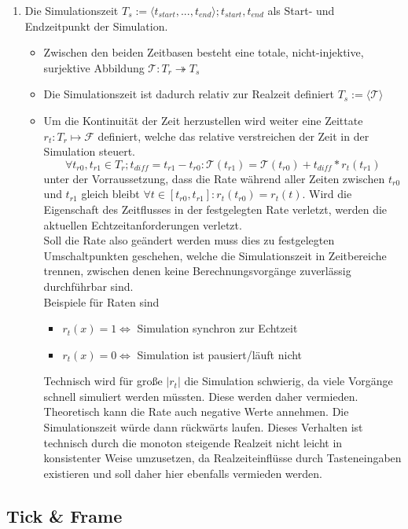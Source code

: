 \begin{enumerate}
\item Die Simulationszeit $T_s:=\langle t_{start}, ... , t_{end}\rangle; t_{start}, t_{end}$ als Start- und Endzeitpunkt der Simulation.
	\begin{itemize}
	\item Zwischen den beiden Zeitbasen besteht eine totale, nicht-injektive, surjektive Abbildung $\mathcal{T}:T_r \twoheadrightarrow T_s$
	\item Die Simulationszeit ist dadurch relativ zur Realzeit definiert $T_s:=\langle\mathcal{T}\rangle$
	\item Um die Kontinuität der Zeit herzustellen wird weiter eine Zeittate $r_t:T_r\mapsto\mathcal{F}$ definiert, welche das relative verstreichen der Zeit in der Simulation steuert. 
	$$\forall t_{r0},  t_{r1} \in T_r ; t_{diff}=t_{r1}-t_{r0} :\mathcal{T}(t_{r1}) = \mathcal{T}(t_{r0}) + t_{diff}*r_t(t_{r1})$$ unter der Vorraussetzung, dass die Rate während aller Zeiten zwischen $t_{r0}$ und $t_{r1}$ gleich bleibt $\forall t \in [ t_{r0},t_{r1}]: r_t( t_{r0}) = r_t(t)$. Wird die Eigenschaft des Zeitflusses in der festgelegten Rate verletzt, werden die aktuellen Echtzeitanforderungen verletzt. \\
	Soll die Rate also geändert werden muss dies zu festgelegten Umschaltpunkten geschehen, welche die Simulationszeit in Zeitbereiche trennen, zwischen denen keine Berechnungsvorgänge zuverlässig durchführbar sind.\\
Beispiele für Raten sind 
\begin{itemize}
\item $r_t(x) = 1 \Leftrightarrow$ Simulation synchron zur Echtzeit
\item $r_t(x) = 0 \Leftrightarrow$ Simulation ist pausiert/läuft nicht
\end{itemize}
Technisch wird für große $|r_t|$ die Simulation schwierig, da viele Vorgänge schnell simuliert werden müssten. Diese werden daher vermieden.\\
Theoretisch kann die Rate auch negative Werte annehmen. Die Simulationszeit würde dann rückwärts laufen. Dieses Verhalten ist technisch durch die monoton steigende Realzeit nicht leicht in konsistenter Weise umzusetzen, da Realzeiteinflüsse durch Tasteneingaben existieren und soll daher hier ebenfalls vermieden werden.
	\end{itemize}
\end{enumerate}	


\subsection{Tick \& Frame}


